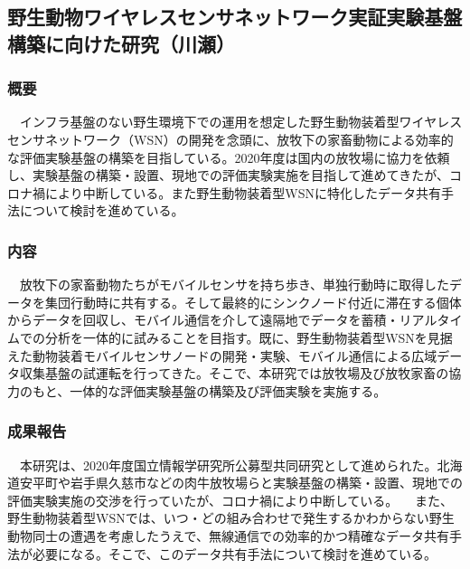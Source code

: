 \subsection{野生動物ワイヤレスセンサネットワーク実証実験基盤構築に向けた研究（川瀬）}
\subsubsection{概要}
　インフラ基盤のない野生環境下での運用を想定した野生動物装着型ワイヤレスセンサネットワーク（WSN）の開発を念頭に、放牧下の家畜動物による効率的な評価実験基盤の構築を目指している。2020年度は国内の放牧場に協力を依頼し、実験基盤の構築・設置、現地での評価実験実施を目指して進めてきたが、コロナ禍により中断している。また野生動物装着型WSNに特化したデータ共有手法について検討を進めている。
\subsubsection{内容}
　放牧下の家畜動物たちがモバイルセンサを持ち歩き、単独行動時に取得したデータを集団行動時に共有する。そして最終的にシンクノード付近に滞在する個体からデータを回収し、モバイル通信を介して遠隔地でデータを蓄積・リアルタイムでの分析を一体的に試みることを目指す。既に、野生動物装着型WSNを見据えた動物装着モバイルセンサノードの開発・実験、モバイル通信による広域データ収集基盤の試運転を行ってきた。そこで、本研究では放牧場及び放牧家畜の協力のもと、一体的な評価実験基盤の構築及び評価実験を実施する。
\subsubsection  {成果報告}
　本研究は、2020年度国立情報学研究所公募型共同研究として進められた。北海道安平町や岩手県久慈市などの肉牛放牧場らと実験基盤の構築・設置、現地での評価実験実施の交渉を行っていたが、コロナ禍により中断している。
　また、野生動物装着型WSNでは、いつ・どの組み合わせで発生するかわからない野生動物同士の遭遇を考慮したうえで、無線通信での効率的かつ精確なデータ共有手法が必要になる。そこで、このデータ共有手法について検討を進めている。
